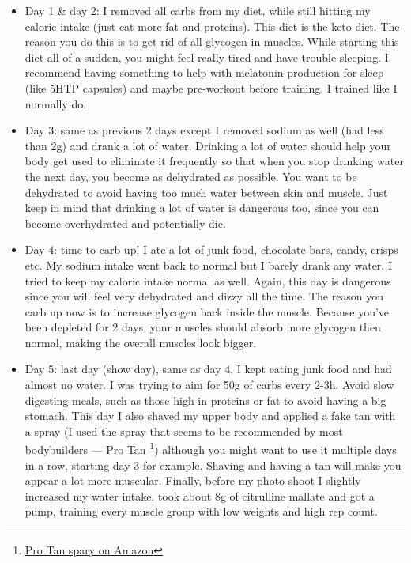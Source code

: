 \documentclass[openany, 12pt]{book}
\begin{document}
        \begin{itemize}
          \item Day 1 \& day 2: I removed all carbs from my diet, while still hitting my caloric intake (just eat more fat and proteins). This diet is the keto diet. The reason you do this is to
            get rid of all glycogen in muscles. While starting this diet all of a sudden, you might feel really tired and have trouble sleeping. I recommend having something to help with melatonin
            production for sleep (like 5HTP capsules) and maybe pre-workout before training. I trained like I normally do.
          \item Day 3: same as previous 2 days except I removed sodium as well (had less than 2g) and drank a lot of water. Drinking a lot of water should help your body get used to eliminate it
            frequently so that when you stop drinking water the next day, you become as dehydrated as possible. You want to be dehydrated to avoid having too much water between skin and
            muscle. Just keep in mind that drinking a lot of water is dangerous too, since you can
            become overhydrated and potentially die.
          \item Day 4: time to carb up! I ate a lot of junk food, chocolate bars, candy, crisps etc. My sodium intake went back to normal but I barely drank any water.
            I tried to keep my caloric intake normal as well. Again, this day is dangerous
            since you will feel very dehydrated and dizzy all the time. The reason you carb up now is to increase glycogen back inside the muscle. Because you've been depleted for 2 days,
            your muscles should absorb more glycogen then normal, making the overall muscles look bigger.
          \item Day 5: last day (show day), same as day 4, I kept eating junk food and had almost no water. I was trying to aim for 50g of carbs every 2-3h.
            Avoid slow digesting meals, such as those high in proteins or fat to avoid having a big
            stomach. This day I also shaved my upper body and applied a fake tan with a spray (I used the spray that seems to be recommended by most bodybuilders --- Pro Tan
            \footnote{\href{https://www.amazon.co.uk/gp/product/B001F6VDGI/}{Pro Tan spary on Amazon}}) although you might want to use it multiple days in a row, starting day 3 for example.
            Shaving and having a tan will make you appear a lot more muscular. Finally, before my photo shoot I slightly increased my water intake, took about 8g of citrulline mallate and got a pump,
            training every muscle group with low weights and high rep count.
        \end{itemize}
\end{document}
